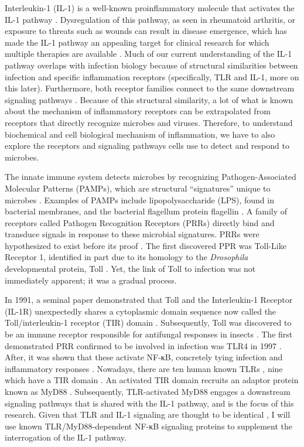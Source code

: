 Interleukin-1{\textbeta} (IL-1{\textbeta}) is a well-known proinflammatory molecule that activates the IL-1 pathway \autocite{Dinarello_2019}. Dysregulation of this pathway, as seen in rheumatoid arthritis, or exposure to threats such as wounds can result in disease emergence, which has made the IL-1 pathway an appealing target for clinical research for which multiple therapies are available \autocite{Dinarello_2019}. Much of our current understanding of the IL-1 pathway overlaps with infection biology because of structural similarities between infection and specific inflammation receptors (specifically, TLR and IL-1, more on this later). Furthermore, both receptor families connect to the same downstream signaling pathways \autocite{Medzhitov_2008}\autocite{Dinarello_2009} \autocite{Takeuchi_2010}\autocite{ONeill_2009}\autocite{Fitzgerald_2020}. Because of this structural similarity, a lot of what is known about the mechanism of inflammatory receptors can be extrapolated from receptors that directly recognize microbes and viruses. Therefore, to understand biochemical and cell biological mechanism of inflammation, we have to also explore the receptors and signaling pathways cells use to detect and respond to microbes.
 
The innate immune system detects microbes by recognizing Pathogen-Associated Molecular Patterns (PAMPs), which are structural “signatures” unique to microbes \autocite{Akira_2003}. Examples of PAMPs include lipopolysaccharide (LPS), found in bacterial membranes, and the bacterial flagellum protein flagellin \autocite{Akira_2006}. A family of receptors called Pathogen Recognition Receptors (PRRs) directly bind and transduce signals in response to these microbial signatures. PRRs were hypothesized to exist before its proof \autocite{Janeway_1989}. The first discovered PPR was Toll-Like Receptor 1, identified in part due to its homology to the \emph{Drosophila} developmental protein, Toll \autocite{Anderson_1985}\autocite{Hashimoto_1988}. Yet, the link of Toll to infection was not immediately apparent; it was a gradual process.
 
In 1991, a seminal paper demonstrated that Toll and the Interleukin-1 Receptor (IL-1R) unexpectedly shares a cytoplasmic domain sequence now called the Toll/interleukin-1 receptor (TIR) domain \autocite{Sims_1988}\autocite{Gay_1991}. Subsequently, Toll was discovered to be an immune receptor responsible for antifungal responses in insects \autocite{Lemaitre_1996}. The first demonstrated PRR confirmed to be involved in infection was TLR4 in 1997 \autocite{Medzhitov_1997}. After, it was shown that these activate NF-κB, concretely tying infection and inflammatory responses \autocite{Alcamo_2001}. Nowadays, there are ten human known TLRs \autocite{ONeill_2013}, nine which have a TIR domain \autocite{ONeill_2013}. An activated TIR domain recruits an adaptor protein known as MyD88 \autocite{Muzio_1997}. Subsequently, TLR-activated MyD88 engages a downstream signaling pathways that is shared with the IL-1 pathway, and is the focus of this research. Given that TLR and IL-1 signaling are thought to be identical \autocite{Balka_2019}\autocite{Pereira_2023}, I will use known TLR/MyD88-dependent NF-κB signaling proteins to supplement the interrogation of the IL-1 pathway.
 
